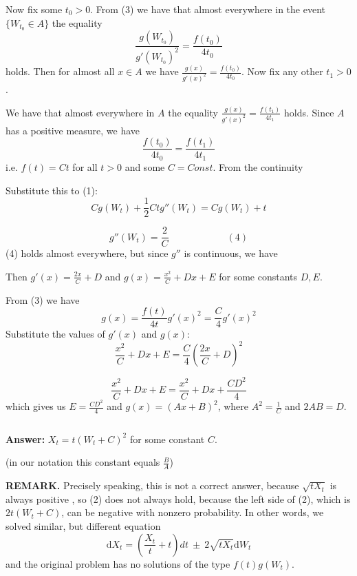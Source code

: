 \documentclass[12pt, a4paper]{article}
\newcommand{\dt}{dt}
\begin{document}
Now fix some $t_0 > 0$. From (3) we have that almost everywhere in the event $\{W_{t_{0}} \in A\}$ the equality
\[
\frac{ g(W_{t_{0}})}{ g'(W_{t_{0}})^{2}} = \frac{ f(t_{0})}{ 4 t_{0}}
\]
holds. Then for almost all $x \in A$ we have $\frac{ g(x)}{ g'(x)^{2}} = \frac{ f(t_{0})}{ 4 t_{0}}$. Now fix any other $t_{1} > 0$.\par
We have that almost everywhere in $A$ the equality $\frac{ g(x)}{ g'(x)^{2}} = \frac{ f(t_{1})}{ 4 t_{1}}$ holds. Since $A$ has a positive measure, we have
\[
\frac{ f(t_{0})}{ 4t_{0}} = \frac{ f(t_{1})}{ 4t_{1}}
\]
i.e. $f(t) = Ct$ for all $t > 0$ and some $C = Const$. From the continuity \[\]\par
Substitute this to (1):
\[
Cg(W_{t}) + \frac{ 1}{ 2}Ctg''(W_{t}) = Cg(W_{t}) + t
\]

\[
g''(W_{t}) = \frac{ 2}{ C}\qquad\qquad\qquad (4)
\]
(4) holds almost everywhere, but since $g''$ is continuous, we have \par
Then $g'(x) =  \frac{ 2x}{ C} + D$ and $g(x) = \frac{ x^{2}}{ C} + Dx + E$ for some constants $D,E$.\par
From (3) we have
\[
g(x) = \frac{ f(t)}{ 4t}g'(x)^{2} = \frac{ C}{ 4}g'(x)^{2}
\]
Substitute the values of $g'(x)$ and $g(x)$:
\[
\frac{ x^{2}}{ C} + Dx + E = \frac{ C}{ 4}\left(\frac{ 2x}{ C} + D\right)^{2}
\]

\[
\frac{ x^{2}}{ C} + Dx + E = \frac{ x^{2}}{ C} + Dx + \frac{ CD^{2}}{ 4}
\]
which gives us $E =  \frac{ CD^{2}}{ 4}$ and $g(x) = (Ax + B)^{2}$, where $A^{2} = \frac{ 1}{ C}$ and $2AB = D$.\par
\[\]\par
\textbf{Answer:} $X_{t} = t(W_{t} + C)^{2}$ for some constant $C$.\par
(in our notation this constant equals $\frac{ B}{ A}$)\par
\textbf{REMARK.} Precisely speaking, this is not a correct answer, because $\sqrt{tX_{t}}$ is always positive , so (2) does not always hold, because the left side of (2), which is $2t(W_{t} + C)$, can be negative with nonzero probability. In other words, we solved similar, but different equation
\[
\mathrm{d}X_{t} = \left(\frac{ X_{t}}{ t} + t\right)\dt\ \pm\ 2\sqrt{t X_{t}}\mathrm{d}W_{t}
\]
and the original problem has no solutions of the type $f(t)g(W_{t})$.
\end{document}
